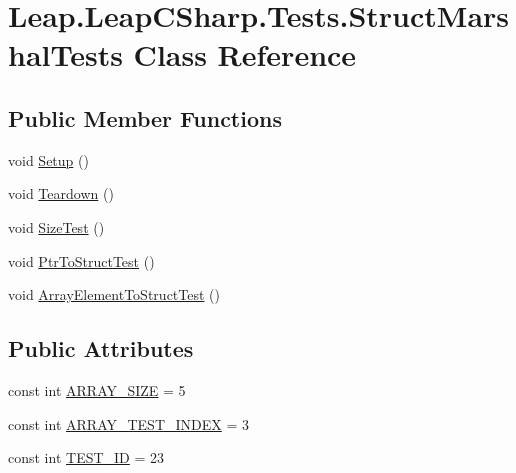 \hypertarget{class_leap_1_1_leap_c_sharp_1_1_tests_1_1_struct_marshal_tests}{}\section{Leap.\+Leap\+C\+Sharp.\+Tests.\+Struct\+Marshal\+Tests Class Reference}
\label{class_leap_1_1_leap_c_sharp_1_1_tests_1_1_struct_marshal_tests}
\subsection*{Public Member Functions}
\begin{DoxyCompactItemize}
\item 
void \mbox{\hyperlink{class_leap_1_1_leap_c_sharp_1_1_tests_1_1_struct_marshal_tests_ad9685e37feb15c81d7766a7959609227}{Setup}} ()
\item 
void \mbox{\hyperlink{class_leap_1_1_leap_c_sharp_1_1_tests_1_1_struct_marshal_tests_ab8fd65b7761b7a0423173f81affe129f}{Teardown}} ()
\item 
void \mbox{\hyperlink{class_leap_1_1_leap_c_sharp_1_1_tests_1_1_struct_marshal_tests_a3c10a893a23723f291d2130e45002781}{Size\+Test}} ()
\item 
void \mbox{\hyperlink{class_leap_1_1_leap_c_sharp_1_1_tests_1_1_struct_marshal_tests_a77668a08f998c376bda76f5d5fc3a932}{Ptr\+To\+Struct\+Test}} ()
\item 
void \mbox{\hyperlink{class_leap_1_1_leap_c_sharp_1_1_tests_1_1_struct_marshal_tests_a76c6c258ce0841fbebd04e4363a9c13c}{Array\+Element\+To\+Struct\+Test}} ()
\end{DoxyCompactItemize}
\subsection*{Public Attributes}
\begin{DoxyCompactItemize}
\item 
const int \mbox{\hyperlink{class_leap_1_1_leap_c_sharp_1_1_tests_1_1_struct_marshal_tests_a0e96ac2a4de8582ad6623d1459d7fda4}{A\+R\+R\+A\+Y\+\_\+\+S\+I\+ZE}} = 5
\item 
const int \mbox{\hyperlink{class_leap_1_1_leap_c_sharp_1_1_tests_1_1_struct_marshal_tests_af0bc3ff18803ea59b5adcd7348aaa504}{A\+R\+R\+A\+Y\+\_\+\+T\+E\+S\+T\+\_\+\+I\+N\+D\+EX}} = 3
\item 
const int \mbox{\hyperlink{class_leap_1_1_leap_c_sharp_1_1_tests_1_1_struct_marshal_tests_aca4bb42c952b27e8fb216d3927d3991b}{T\+E\+S\+T\+\_\+\+ID}} = 23
\end{DoxyCompactItemize}


